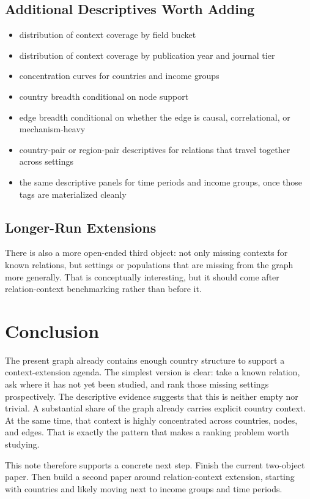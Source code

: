 \documentclass[11pt]{article}
\begin{document}
\subsection{Additional Descriptives Worth Adding}
\begin{itemize}
    \item distribution of context coverage by field bucket
    \item distribution of context coverage by publication year and journal tier
    \item concentration curves for countries and income groups
    \item country breadth conditional on node support
    \item edge breadth conditional on whether the edge is causal, correlational, or mechanism-heavy
    \item country-pair or region-pair descriptives for relations that travel together across settings
    \item the same descriptive panels for time periods and income groups, once those tags are materialized cleanly
\end{itemize}

\subsection{Longer-Run Extensions}
There is also a more open-ended third object: not only missing contexts for known relations, but settings or populations that are missing from the graph more generally. That is conceptually interesting, but it should come after relation-context benchmarking rather than before it.

\section{Conclusion}
The present graph already contains enough country structure to support a context-extension agenda. The simplest version is clear: take a known relation, ask where it has not yet been studied, and rank those missing settings prospectively. The descriptive evidence suggests that this is neither empty nor trivial. A substantial share of the graph already carries explicit country context. At the same time, that context is highly concentrated across countries, nodes, and edges. That is exactly the pattern that makes a ranking problem worth studying.

This note therefore supports a concrete next step. Finish the current two-object paper. Then build a second paper around relation-context extension, starting with countries and likely moving next to income groups and time periods.



\end{document}
